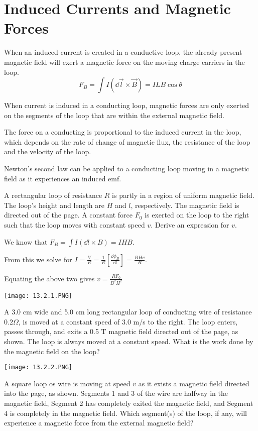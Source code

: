 \documentclass[../em.tex]{subfiles}
\begin{document}
\section{Induced Currents and Magnetic Forces}
When an induced current is created in a conductive loop, the already present magnetic field will exert a magnetic force on the moving charge carriers in the loop.
\[ F_B = \int I(\dd \vec{l}\times \vec{B}) = ILB\cos\theta \]

When current is induced in a conducting loop, magnetic forces are only exerted on the segments of the loop that are within the external magnetic field.

The force on a conducting is proportional to the induced current in the loop, which depends on the rate of change of magnetic flux, the resistance 
of the loop and the velocity of the loop.

Newton's second law can be applied to a conducting loop moving in a magnetic field as it experiences an induced emf.

\begin{example}
    A rectangular loop of resistance $R$ is partly in a region of uniform magnetic field. The loop's height and length are $H$ and $l$, respectively. The magnetic field is directed out of the page.
    A constant force $F_0$ is exerted on the loop to the right such that the loop moves with constant speed $v$. Derive an expression for $v$.

    We know that $F_B=\int I(\dd l\times B)=IHB$.

    From this we solve for $I=\frac{V}{R}=\frac{1}{R}\left[\frac{\dd \phi_B}{\dd t}\right]=\frac{BHv}{R}$.

    Equating the above two gives $v=\frac{RF_0}{B^2H^2}$
\end{example}

\pagebreak
\ex \begin{center}
    \texttt{[image: 13.2.1.PNG]}
\end{center}
A 3.0 cm wide and 5.0 cm long rectangular loop of conducting wire of resistance $0.2\Omega$, is moved at a constant speed of 3.0 m/s to the right. The loop enters, passes through, and exits a 0.5 T 
magnetic field directed out of the page, as shown. The loop is always moved at a constant speed. What is the work done by the magnetic field on the loop?

\ex \begin{center}
    \texttt{[image: 13.2.2.PNG]}
\end{center}
A square loop os wire is moving at speed $v$ as it exists a magnetic field directed into the page, as shown. Segments 1 and 3 of the wire are halfway in the magnetic field, Segment 2 
has completely exited the magnetic field, and Segment 4 is completely in the magnetic field. Which segment(s) of the loop, if any, will experience a magnetic force from the external magnetic field?
\end{document}
